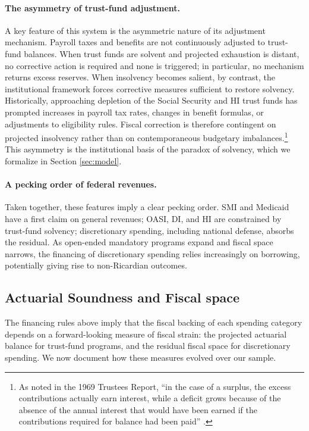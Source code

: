 \documentclass[12pt]{article}%
\theoremstyle{remark}
\begin{document}
\paragraph{The asymmetry of trust-fund adjustment.} A key feature of this system is the asymmetric nature of its adjustment mechanism. Payroll taxes and benefits are not continuously adjusted to trust-fund balances. When trust funds are solvent and projected exhaustion is distant, no corrective action is required and none is triggered; in particular, no mechanism returns excess reserves. When insolvency becomes salient, by contrast, the institutional framework forces corrective measures sufficient to restore solvency. Historically, approaching depletion of the Social Security and HI trust funds has prompted increases in payroll tax rates, changes in benefit formulas, or adjustments to eligibility rules. Fiscal correction is therefore contingent on projected insolvency rather than on contemporaneous budgetary imbalances.\footnote{As noted in the 1969 Trustees Report, ``in the case of a surplus, the excess contributions actually earn interest, while a deficit grows because of the absence of the annual interest that would have been earned if the contributions required for balance had been paid'' \citep[p.~38]{Trustees1969}.} This asymmetry is the institutional basis of the paradox of solvency, which we formalize in Section \ref{sec:model}.
\paragraph{A pecking order of federal revenues.} Taken together, these features imply a clear pecking order. SMI and Medicaid have a first claim on general revenues; OASI, DI, and HI are constrained by trust-fund solvency; discretionary spending, including national defense, absorbs the residual. As open-ended mandatory programs expand and fiscal space narrows, the financing of discretionary spending relies increasingly on borrowing, potentially giving rise to non-Ricardian outcomes.




\subsection{Actuarial Soundness and Fiscal space} \label{sec:actuarial_soundeness}

The financing rules above imply that the fiscal backing of each spending category depends on a forward-looking measure of fiscal strain: the projected actuarial balance for trust-fund programs, and the residual fiscal space for discretionary spending. We now document how these measures evolved over our sample.
\end{document}
